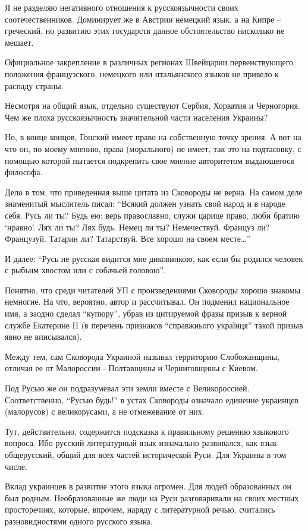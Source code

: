 Я не разделяю негативного отношения к русскоязычности своих соотечественников.
Доминирует же в Австрии немецкий язык, а на Кипре – греческий, но развитию этих
государств данное обстоятельство нисколько не мешает.

Официальное закрепление в различных регионах Швейцарии первенствующего
положения французского, немецкого или итальянского языков не привело к распаду
страны.

Несмотря на общий язык, отдельно существуют Сербия, Хорватия и Черногория. Чем
же плоха русскоязычность значительной части населения Украины?

Но, в конце концов, Гонский имеет право на собственную точку зрения. А вот на
что он, по моему мнению, права (морального) не имеет, так это на подтасовку, с
помощью которой пытается подкрепить свое мнение авторитетом выдающегося
философа.

Дело в том, что приведенная выше цитата из Сковороды не верна. На самом деле
знаменитый мыслитель писал: \enquote{Всякий должен узнать свой народ и в народе себя.
Русь ли ты? Будь ею: верь православно, служи царице право, люби братию
\enquote{нравно}. Лях ли ты? Лях будь. Немец ли ты? Немечествуй. Француз ли? Французуй.
Татарин ли? Татарствуй. Все хорошо на своем месте…}

И далее: \enquote{Русь не русская видится мне диковинкою, как если бы родился человек с
рыбьим хвостом или с собачьей головою}.

Понятно, что среди читателей УП с произведениями Сковороды хорошо знакомы
немногие. На что, вероятно, автор и рассчитывал. Он подменил национальное имя,
а заодно сделал \enquote{купюру}, убрав из цитируемой фразы призыв к верной службе
Екатерине II (в перечень признаков \enquote{справжнього українця} такой призыв явно не
вписывался).

Между тем, сам Сковорода Украиной называл территорию Слобожанщины, отличая ее
от Малороссии - Полтавщины и Черниговщины с Киевом.

Под Русью же он подразумевал эти земли вместе с Великороссией. Соответственно,
\enquote{Русью будь!} в устах Сковороды означало единение украинцев (малорусов) с
великорусами, а не отмежевание от них.

Тут, действительно, содержится подсказка к правильному решению языкового
вопроса. Ибо русский литературный язык изначально развивался, как язык
общерусский, общий для всех частей исторической Руси. Для Украины в том числе.

Вклад украинцев в развитие этого языка огромен. Для людей образованных он был
родным. Необразованные же люди на Руси разговаривали на своих местных
просторечиях, которые, впрочем, наряду с литературной речью, считались
разновидностями одного русского языка.

